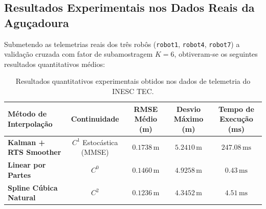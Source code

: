 \documentclass[11pt,a4paper]{article}
\theoremstyle{definition}
\begin{document}
\subsection{Resultados Experimentais nos Dados Reais da Aguçadoura}
Submetendo as telemetrias reais dos três robôs (\texttt{robot1}, \texttt{robot4}, \texttt{robot7}) a validação cruzada com fator de subamostragem $K=6$, obtiveram-se os seguintes resultados quantitativos médios:

\begin{table}[H]
\centering
\small
\begin{tabular}{lcccc}
\toprule
\textbf{Método de Interpolação} & \textbf{Continuidade} & \textbf{RMSE Médio (m)} & \textbf{Desvio Máximo (m)} & \textbf{Tempo de Execução (ms)} \\
\midrule
\textbf{Kalman + RTS Smoother} & $C^1$ Estocástica (MMSE) & $0.1738\,\text{m}$ & $5.2410\,\text{m}$ & $247.08\,\text{ms}$ \\
\textbf{Linear por Partes} & $C^0$ & $0.1460\,\text{m}$ & $4.9258\,\text{m}$ & $0.43\,\text{ms}$ \\
\textbf{Spline Cúbica Natural} & $C^2$ & $0.1236\,\text{m}$ & $4.3452\,\text{m}$ & $4.51\,\text{ms}$ \\
\bottomrule
\end{tabular}
\caption{Resultados quantitativos experimentais obtidos nos dados de telemetria do INESC TEC.}
\end{table}
\end{document}
